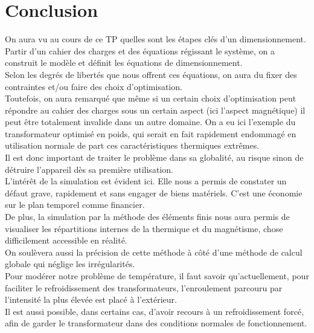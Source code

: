 \section{Conclusion}
On aura vu au cours de ce TP quelles sont les étapes clés d'un dimensionnement.\\
Partir d'un cahier des charges et des équations régissant le système, on a construit le modèle et définit les équations de dimensionnement.\\
Selon les degrés de libertés que nous offrent ces équations, on aura du fixer des contraintes et/ou faire des choix d'optimisation.\\

Toutefois, on aura remarqué que même si un certain choix d'optimisation peut répondre au cahier des charges sous un certain aspect (ici l'aspect magnétique) il peut être totalement invalide dans un autre domaine. On a eu ici l'exemple du transformateur optimisé en poids, qui serait en fait rapidement endommagé en utilisation normale de part ces caractéristiques thermiques extrêmes.\\
Il est donc important de traiter le problème dans sa globalité, au risque sinon de détruire l'appareil dès sa première utilisation.\\

L'intérêt de la simulation est évident ici. Elle nous a permis de constater un défaut grave, rapidement et sans engager de biens matériels. C'est une économie sur le plan temporel comme financier.\\
De plus, la simulation par la méthode des éléments finis nous aura permis de visualiser les répartitions internes de la thermique et du magnétisme, chose difficilement accessible en réalité.\\
On soulèvera aussi la précision de cette méthode à côté d'une méthode de calcul globale qui néglige les irrégularités.\\

Pour modérer notre problème de température, il faut savoir qu'actuellement, pour faciliter le refroidissement des transformateurs, l’enroulement parcouru par l’intensité la plus élevée est placé à l’extérieur.\\
Il est aussi possible, dans certains cas, d'avoir recours à un refroidissement forcé, afin de garder le transformateur dans des conditions normales de fonctionnement.